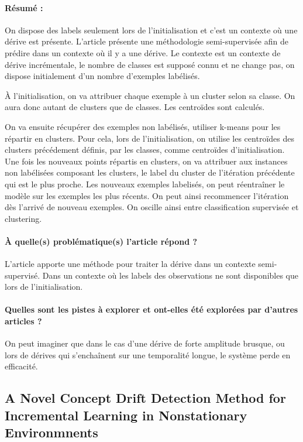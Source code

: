 \documentclass[11pt,a4paper]{report}
\begin{document}
\paragraph{Résumé :} On dispose des labels seulement lors de l'initialisation et c'est un contexte où une dérive est présente.
L'article présente une méthodologie semi-supervisée afin de prédire dans un contexte où il y a une dérive. Le contexte est un contexte de dérive incrémentale, le nombre de classes est supposé connu et ne change pas, on dispose initialement d'un nombre d'exemples labélisés.

 À l'initialisation, on va attribuer chaque exemple à un cluster selon sa classe. On aura donc autant de clusters que de classes. Les centroïdes sont calculés.
 
 On va ensuite récupérer des exemples non labélisés, utiliser k-means pour les répartir en clusters. Pour cela, lors de l'initialisation, on utilise les centroïdes des clusters précédement définis, par les classes, comme centroïdes d'initialisation. Une fois les nouveaux points répartis en clusters, on va attribuer aux instances non labélisées composant les clusters, le label du cluster de l'itération précédente qui est le plus proche. Les nouveaux exemples labelisés, on peut réentraîner le modèle sur les exemples les plus récents. 
On peut ainsi recommencer l'itération dès l'arrivé de nouveau exemples. On oscille ainsi entre classification supervisée et clustering.

\paragraph{À quelle(s) problématique(s) l'article répond ?} L'article apporte une méthode pour traiter la dérive dans un contexte semi-supervisé. Dans un contexte où les labels des observations ne sont disponibles que lors de l'initialisation.

\paragraph{Quelles sont les pistes à explorer et ont-elles  été explorées par d'autres articles ?} On peut imaginer que dans le cas d'une dérive de forte amplitude brusque, ou lors de dérives qui s'enchaînent sur une temporalité longue, le système perde en efficacité.




\subsection{A Novel Concept Drift Detection Method for Incremental Learning in Nonstationary Environmnents}
\end{document}
